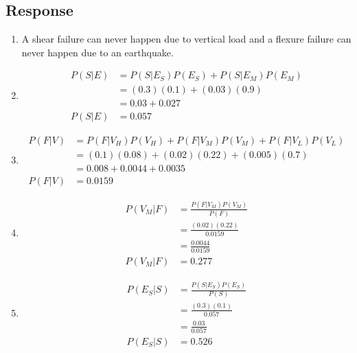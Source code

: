 \documentclass[13pt]{article}
\begin{document}
\subsection*{Response}
\begin{enumerate}[label=\textbf{\alph*.}]
\item A shear failure can never happen due to vertical load and a
  flexure failure can never happen due to an earthquake.
\item
  \begin{align*}
    P(S|E) &= P(S|E_S)P(E_S) + P(S|E_M)P(E_M) \\
           &= (0.3)(0.1) + (0.03)(0.9) \\
           &= 0.03 + 0.027 \\
    P(S|E) &= 0.057
  \end{align*}

\item
  \begin{align*}
    P(F|V) &= P(F|V_H)P(V_H) + P(F|V_M)P(V_M) + P(F|V_L)P(V_L) \\
           &= (0.1)(0.08) + (0.02)(0.22) + (0.005)(0.7) \\
           &= 0.008 + 0.0044 + 0.0035 \\
    P(F|V) &= 0.0159
  \end{align*}

\item 
  \begin{align*}
    P(V_M|F) &= \frac{P(F|V_M)P(V_M)}{P(F)} \\
             &= \frac{(0.02)(0.22)}{0.0159} \\
             &= \frac{0.0044}{0.0159} \\
    P(V_M|F) &= 0.277
  \end{align*}
  
\item
  \begin{align*}
    P(E_S|S) &= \frac{P(S|E_S)P(E_S)}{P(S)} \\
             &= \frac{(0.3)(0.1)}{0.057} \\
             &= \frac{0.03}{0.057} \\
    P(E_S|S) &= 0.526
  \end{align*}
\end{enumerate}





\newpage
\end{document}
